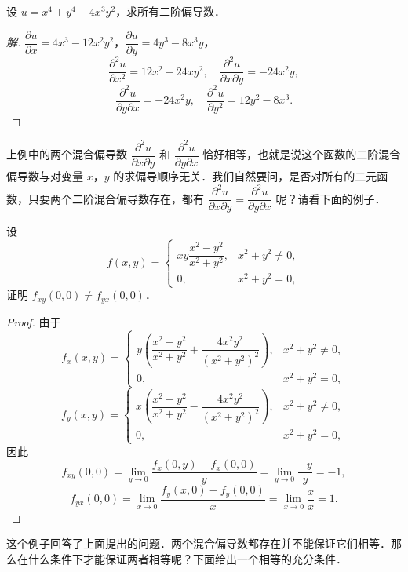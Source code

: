 \begin{example}\label{ex:16-1-7}
设 $u=x^{4}+y^{4}-4x^{3}y^{2}$，求所有二阶偏导数．
\end{example}

\begin{proof}[解]
$\dfrac{\partial u}{\partial x}=4x^{3}-12x^{2}y^{2}$，$\dfrac{\partial u}{\partial y}=4y^{3}-8x^{3}y$，
\[
\frac{\partial^{2}u}{\partial x^{2}}=12x^{2}-24xy^{2},\quad\frac{\partial^{2}u}{\partial x\partial y}=-24x^{2}y,
\]
\[
\frac{\partial^{2}u}{\partial y\partial x}=-24x^{2}y,\quad\frac{\partial^{2}u}{\partial y^{2}}=12y^{2}-8x^{3}.
\]
\end{proof}

上例中的两个混合偏导数 $\dfrac{\partial^{2}u}{\partial x\partial y}$ 和 $\dfrac{\partial^{2}u}{\partial y\partial x}$ 恰好相等，也就是说这个函数的二阶混合偏导数与对变量 $x$，$y$ 的求偏导顺序无关．我们自然要问，是否对所有的二元函数，只要两个二阶混合偏导数存在，都有 $\dfrac{\partial^{2}u}{\partial x\partial y}=\dfrac{\partial^{2}u}{\partial y\partial x}$ 呢？请看下面的例子．

\begin{example}\label{ex:16-1-8}
设
\[
f(x,y)=\begin{cases}
xy\dfrac{x^{2}-y^{2}}{x^{2}+y^{2}}, & x^{2}+y^{2}\neq 0,\\
0, & x^{2}+y^{2}=0,
\end{cases}
\]
证明 $f_{xy}(0,0)\neq f_{yx}(0,0)$．
\end{example}

\begin{proof}
由于
\[
f_{x}(x,y)=\begin{cases}
y\left(\dfrac{x^{2}-y^{2}}{x^{2}+y^{2}}+\dfrac{4x^{2}y^{2}}{(x^{2}+y^{2})^{2}}\right), & x^{2}+y^{2}\neq 0,\\
0, & x^{2}+y^{2}=0,
\end{cases}
\]
\[
f_{y}(x,y)=\begin{cases}
x\left(\dfrac{x^{2}-y^{2}}{x^{2}+y^{2}}-\dfrac{4x^{2}y^{2}}{(x^{2}+y^{2})^{2}}\right), & x^{2}+y^{2}\neq 0,\\
0, & x^{2}+y^{2}=0,
\end{cases}
\]
因此
\[
f_{xy}(0,0)=\lim_{y\to 0}\frac{f_{x}(0,y)-f_{x}(0,0)}{y}=\lim_{y\to 0}\frac{-y}{y}=-1,
\]
\[
f_{yx}(0,0)=\lim_{x\to 0}\frac{f_{y}(x,0)-f_{y}(0,0)}{x}=\lim_{x\to 0}\frac{x}{x}=1.
\]
\end{proof}

这个例子回答了上面提出的问题．两个混合偏导数都存在并不能保证它们相等．那么在什么条件下才能保证两者相等呢？下面给出一个相等的充分条件．

